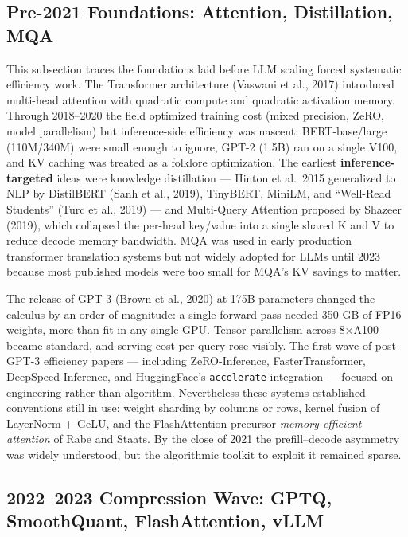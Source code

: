 \subsection{Pre-2021 Foundations: Attention, Distillation, MQA}\label{pre-2021-foundations-attention-distillation-mqa}

This subsection traces the foundations laid before LLM scaling forced systematic efficiency work. The Transformer architecture (Vaswani et al., 2017) introduced multi-head attention with quadratic compute and quadratic activation memory. Through 2018--2020 the field optimized training cost (mixed precision, ZeRO, model parallelism) but inference-side efficiency was nascent: BERT-base/large (110M/340M) were small enough to ignore, GPT-2 (1.5B) ran on a single V100, and KV caching was treated as a folklore optimization. The earliest \textbf{inference-targeted} ideas were knowledge distillation --- Hinton et al.~2015 generalized to NLP by DistilBERT (Sanh et al., 2019), TinyBERT, MiniLM, and ``Well-Read Students'' (Turc et al., 2019) --- and Multi-Query Attention proposed by Shazeer (2019), which collapsed the per-head key/value into a single shared K and V to reduce decode memory bandwidth. MQA was used in early production transformer translation systems but not widely adopted for LLMs until 2023 because most published models were too small for MQA's KV savings to matter.

The release of GPT-3 (Brown et al., 2020) at 175B parameters changed the calculus by an order of magnitude: a single forward pass needed 350 GB of FP16 weights, more than fit in any single GPU. Tensor parallelism across 8×A100 became standard, and serving cost per query rose visibly. The first wave of post-GPT-3 efficiency papers --- including ZeRO-Inference, FasterTransformer, DeepSpeed-Inference, and HuggingFace's \texttt{accelerate} integration --- focused on engineering rather than algorithm. Nevertheless these systems established conventions still in use: weight sharding by columns or rows, kernel fusion of LayerNorm + GeLU, and the FlashAttention precursor \emph{memory-efficient attention} of Rabe and Staats. By the close of 2021 the prefill--decode asymmetry was widely understood, but the algorithmic toolkit to exploit it remained sparse.

\subsection{2022--2023 Compression Wave: GPTQ, SmoothQuant, FlashAttention, vLLM}\label{compression-wave-gptq-smoothquant-flashattention-vllm}

